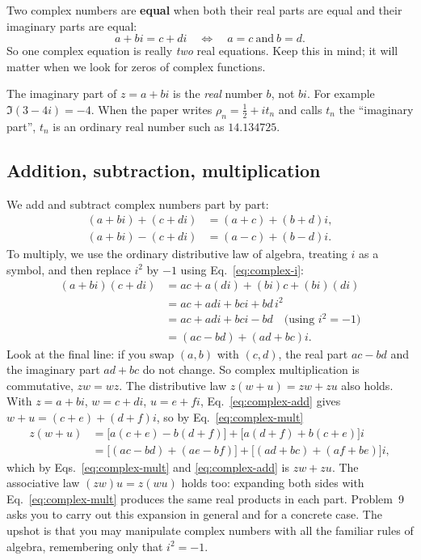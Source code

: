 Two complex numbers are \textbf{equal} when both their real parts are equal and their imaginary parts are equal:
\begin{equation}
a+bi=c+di\quad\Longleftrightarrow\quad a=c\ \text{and}\ b=d.\label{eq:complex-equal}
\end{equation}
So one complex equation is really \emph{two} real equations. Keep this in mind; it will matter when we look for zeros of complex functions.

\begin{pitfall}
The imaginary part of $z=a+bi$ is the \emph{real} number $b$, not $bi$. For example $\Im(3-4i)=-4$. When the paper writes $\rho_n=\tfrac12+it_n$ and calls $t_n$ the ``imaginary part'', $t_n$ is an ordinary real number such as $14.134725$.
\end{pitfall}

\subsection{Addition, subtraction, multiplication}

We add and subtract complex numbers part by part:
\begin{align}
(a+bi)+(c+di)&=(a+c)+(b+d)i,\label{eq:complex-add}\\
(a+bi)-(c+di)&=(a-c)+(b-d)i.\nonumber
\end{align}
To multiply, we use the ordinary distributive law of algebra, treating $i$ as a symbol, and then replace $i^2$ by $-1$ using Eq.~\eqref{eq:complex-i}:
\begin{align}
(a+bi)(c+di)&=ac+a(di)+(bi)c+(bi)(di)\nonumber\\
&=ac+adi+bci+bd\,i^2\nonumber\\
&=ac+adi+bci-bd\quad\text{(using $i^2=-1$)}\nonumber\\
&=(ac-bd)+(ad+bc)i.\label{eq:complex-mult}
\end{align}
Look at the final line: if you swap $(a,b)$ with $(c,d)$, the real part $ac-bd$ and the imaginary part $ad+bc$ do not change. So complex multiplication is commutative, $zw=wz$. The distributive law $z(w+u)=zw+zu$ also holds. With $z=a+bi$, $w=c+di$, $u=e+fi$, Eq.~\eqref{eq:complex-add} gives $w+u=(c+e)+(d+f)i$, so by Eq.~\eqref{eq:complex-mult}
\begin{align*}
z(w+u)&=\bigl[a(c+e)-b(d+f)\bigr]+\bigl[a(d+f)+b(c+e)\bigr]i\\
&=\bigl[(ac-bd)+(ae-bf)\bigr]+\bigl[(ad+bc)+(af+be)\bigr]i ,
\end{align*}
which by Eqs.~\eqref{eq:complex-mult} and \eqref{eq:complex-add} is $zw+zu$. The associative law $(zw)u=z(wu)$ holds too: expanding both sides with Eq.~\eqref{eq:complex-mult} produces the same real products in each part. Problem~9 asks you to carry out this expansion in general and for a concrete case. The upshot is that you may manipulate complex numbers with all the familiar rules of algebra, remembering only that $i^2=-1$.

